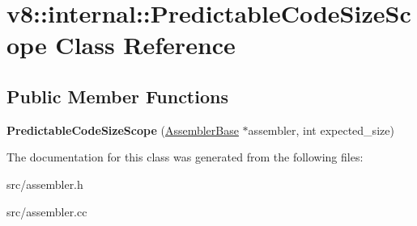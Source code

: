 \hypertarget{classv8_1_1internal_1_1_predictable_code_size_scope}{}\section{v8\+:\+:internal\+:\+:Predictable\+Code\+Size\+Scope Class Reference}
\label{classv8_1_1internal_1_1_predictable_code_size_scope}
\subsection*{Public Member Functions}
\begin{DoxyCompactItemize}
\item 
\hypertarget{classv8_1_1internal_1_1_predictable_code_size_scope_ae85d285b218bedb8bd2ab9d3c37a930d}{}{\bfseries Predictable\+Code\+Size\+Scope} (\hyperlink{classv8_1_1internal_1_1_assembler_base}{Assembler\+Base} $\ast$assembler, int expected\+\_\+size)\label{classv8_1_1internal_1_1_predictable_code_size_scope_ae85d285b218bedb8bd2ab9d3c37a930d}

\end{DoxyCompactItemize}


The documentation for this class was generated from the following files\+:\begin{DoxyCompactItemize}
\item 
src/assembler.\+h\item 
src/assembler.\+cc\end{DoxyCompactItemize}
